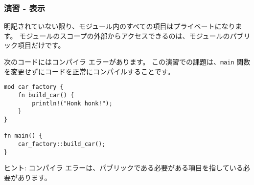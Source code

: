 \subsubsection{演習 - 表示}

明記されていない限り、モジュール内のすべての項目はプライベートになります。 モジュールのスコープの外部からアクセスできるのは、モジュールのパブリック項目だけです。

次のコードにはコンパイラ エラーがあります。 この演習での課題は、\texttt{main} 関数を変更せずにコードを正常にコンパイルすることです。

\begin{lstlisting}[numbers=none]
mod car_factory {
    fn build_car() {
        println!("Honk honk!");
    }
}

fn main() {
    car_factory::build_car();
}
\end{lstlisting}

ヒント: コンパイラ エラーは、パブリックである必要がある項目を指している必要があります。

